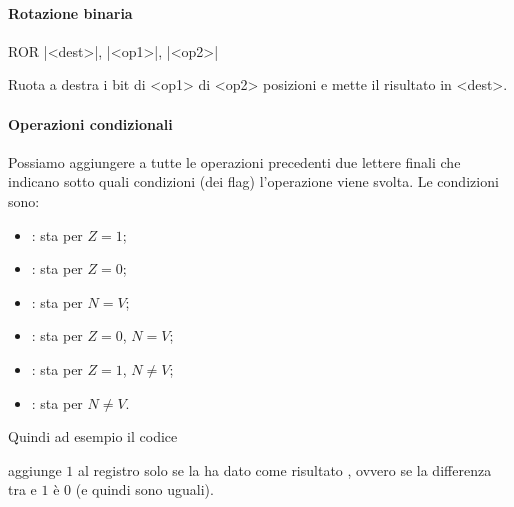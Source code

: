 \paragraph{Rotazione binaria}
\begin{ARMcode}
    ROR |<dest>|, |<op1>|, |<op2>|
\end{ARMcode}
Ruota a destra i bit di <op1> di <op2> posizioni e mette il risultato in <dest>.

\paragraph*{Operazioni condizionali}
Possiamo aggiungere a tutte le operazioni precedenti due lettere finali che indicano sotto quali condizioni (dei flag) l'operazione viene svolta. Le condizioni sono:
\begin{itemize}
    \item {}: sta per $Z = 1$;
    \item {}: sta per $Z = 0$;
    \item {}: sta per $N = V$;
    \item {}: sta per $Z = 0$, $N = V$;
    \item {}: sta per $Z = 1$, $N \neq V$;
    \item {}: sta per $N \neq V$.
\end{itemize}

Quindi ad esempio il codice
aggiunge $1$ al registro  solo se la  ha dato come risultato , ovvero se la differenza tra  e $1$ è $0$ (e quindi sono uguali).